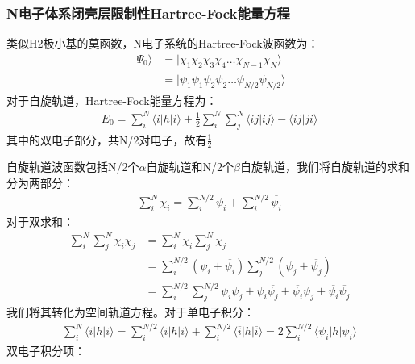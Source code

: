 \documentclass[12pt, a4paper, oneside]{ctexart}
\begin{document}
\subsubsection{N电子体系闭壳层限制性Hartree-Fock能量方程}
类似H2极小基的莫函数，N电子系统的Hartree-Fock波函数为：
\begin{equation}
\begin{aligned}
|\Psi_0\rangle&=|\chi_1\chi_2\chi_3\chi_4\dots\chi_{N-1}\chi_N\rangle\\
			&=|\psi_1\overline{\psi_1}\psi_2\overline{\psi_2}\dots\psi_{N/2}\overline{\psi_{N/2}}\rangle
\end{aligned}
\end{equation}
对于自旋轨道，Hartree-Fock能量方程为：
\begin{equation}
\begin{aligned}
E_0=\sum_i^N\langle i|h|i\rangle+\frac12\sum_i^N\sum_j^N\langle ij|ij\rangle-\langle ij|ji\rangle
\end{aligned}
\end{equation}
其中的双电子部分，共N/2对电子，故有$\frac12$\par
自旋轨道波函数包括N/2个$\alpha$自旋轨道和N/2个$\beta$自旋轨道，我们将自旋轨道的求和分为两部分：
\begin{equation}
\begin{aligned}
\sum_i^N\chi_i=\sum_i^{N/2}\psi_i+\sum_i^{N/2}\overline{\psi_i}
\end{aligned}
\end{equation}
对于双求和：
\begin{equation}
\begin{aligned}
\sum_i^N\sum_j^N\chi_i\chi_j&=\sum_i^N\chi_i\sum_j^N\chi_j\\
&=\sum_i^{N/2}(\psi_i+\overline{\psi_i})\sum_j^{N/2}(\psi_j+\overline{\psi_j})\\
&=\sum_i^{N/2}\sum_j^{N/2}\psi_i\psi_j+\psi_i\overline{\psi_j}+\overline{\psi_i}\psi_j+\overline{\psi_i}\overline{\psi_j}
\end{aligned}
\end{equation}
我们将其转化为空间轨道方程。对于单电子积分：
\begin{equation}
\begin{aligned}
\sum_i^N\langle i|h|i\rangle=\sum_i^{N/2}\langle i|h|i\rangle+\sum_i^{N/2}\langle \overline{i}|h|\overline{i}\rangle=2\sum_i^{N/2}\langle\psi_i|h|\psi_i\rangle
\end{aligned}
\end{equation}
双电子积分项：
\end{document}

